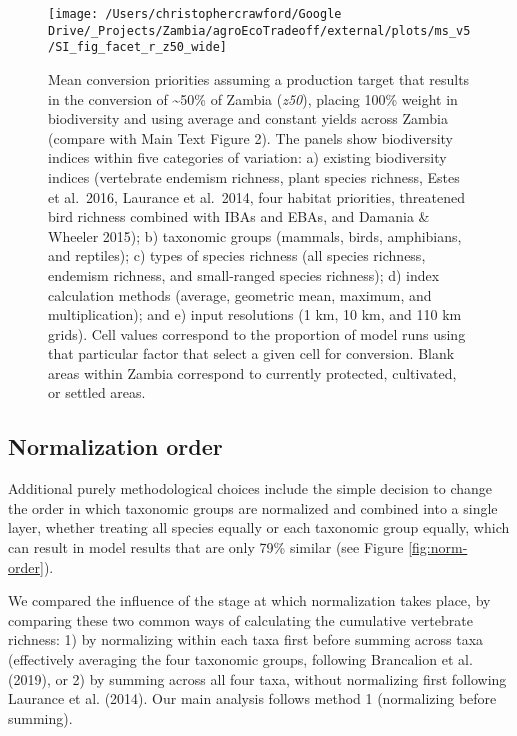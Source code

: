 \documentclass[
]{article}
\begin{document}
\begin{figure}
\texttt{[image: /Users/christophercrawford/Google Drive/\_Projects/Zambia/agroEcoTradeoff/external/plots/ms\_v5/SI\_fig\_facet\_r\_z50\_wide]} \caption{Mean conversion priorities assuming a production target that results in the conversion of \textasciitilde50\% of Zambia (\emph{z50}), placing 100\% weight in biodiversity and using average and constant yields across Zambia (compare with Main Text Figure 2). The panels show biodiversity indices within five categories of variation: a) existing biodiversity indices (vertebrate endemism richness, plant species richness, Estes et al.~2016, Laurance et al.~2014, four habitat priorities, threatened bird richness combined with IBAs and EBAs, and Damania \& Wheeler 2015); b) taxonomic groups (mammals, birds, amphibians, and reptiles); c) types of species richness (all species richness, endemism richness, and small-ranged species richness); d) index calculation methods (average, geometric mean, maximum, and multiplication); and e) input resolutions (1 km, 10 km, and 110 km grids). Cell values correspond to the proportion of model runs using that particular factor that select a given cell for conversion. Blank areas within Zambia correspond to currently protected, cultivated, or settled areas.}\label{fig:facet-r-z50}
\end{figure}

\newpage

\hypertarget{section-norm-order}{%
\subsection{Normalization order}\label{section-norm-order}}

Additional purely methodological choices include the simple decision to change the order in which taxonomic groups are normalized and combined into a single layer, whether treating all species equally or each taxonomic group equally, which can result in model results that are only 79\% similar (see Figure \ref{fig:norm-order}).

We compared the influence of the stage at which normalization takes place, by comparing these two common ways of calculating the cumulative vertebrate richness: 1) by normalizing within each taxa first before summing across taxa (effectively averaging the four taxonomic groups, following Brancalion et al. (2019), or 2) by summing across all four taxa, without normalizing first following Laurance et al. (2014). Our main analysis follows method 1 (normalizing before summing).
\end{document}
